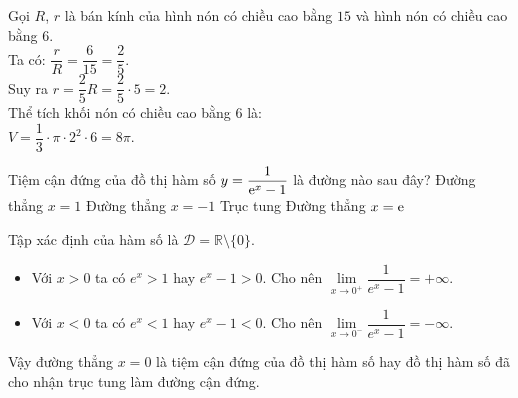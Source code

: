 \begin{ex}%
  {
  }
 \loigiai
  {
  Gọi $R$, $r$ là bán kính của hình nón có chiều cao bằng $15$ và hình nón có chiều cao bằng $6$.\\
  Ta có: $\dfrac{r}{R} = \dfrac{6}{15} = \dfrac{2}{5}$.\\
  Suy ra $r = \dfrac{2}{5}R = \dfrac{2}{5} \cdot 5 = 2$.\\
  Thể tích khối nón có chiều cao bằng $6$ là:\\
  $V = \dfrac{1}{3} \cdot \pi \cdot 2^2 \cdot 6 = 8 \pi$.
  }
\end{ex}


\begin{ex}%
 Tiệm cận đứng của đồ thị hàm số $y = \dfrac{1}{{\rm e}^x - 1}$ là đường nào sau đây?
 \choice
  {Đường thẳng $x = 1$}
  {Đường thẳng $x = -1$}
  {\True Trục tung}
  {Đường thẳng $x = \rm{e}$}
 \loigiai
  {
  Tập xác định của hàm số là $\mathscr{D} = \mathbb{R} \setminus \{0\}$.
  \begin{itemize}
  \item Với $x > 0$ ta có $e^x > 1$ hay $e^x - 1 > 0$. Cho nên $\lim\limits_{x \to 0^+} \dfrac{1}{e^x - 1} = +\infty$.
  \item Với $x < 0$ ta có $e^x < 1$ hay $e^x - 1 < 0$. Cho nên $\lim\limits_{x \to 0^-} \dfrac{1}{e^x - 1} = -\infty$.
  \end{itemize}
  Vậy đường thẳng $x = 0$ là tiệm cận đứng của đồ thị hàm số hay đồ thị hàm số đã cho nhận trục tung làm đường cận đứng.
  }
\end{ex}


